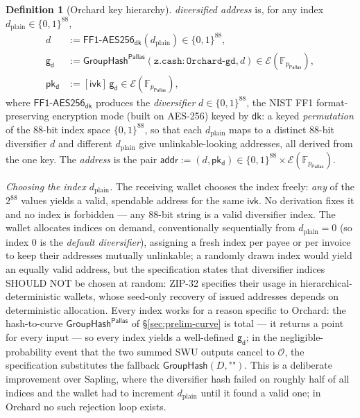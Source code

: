 \documentclass[11pt,a4paper]{article}
\theoremstyle{definition}
\newtheorem{definition}[theorem]{Definition}
\newcommand{\F}{\mathbb{F}}
\newcommand{\Pallas}{\ensuremath{\mathsf{Pallas}}}
\newcommand{\Ep}{\ensuremath{\mathcal{E}}}
\newcommand{\GroupHash}{\ensuremath{\mathsf{GroupHash}}}
\newcommand{\ivk}{\ensuremath{\mathsf{ivk}}}
\newcommand{\dk}{\ensuremath{\mathsf{dk}}}
\newcommand{\pkd}{\ensuremath{\mathsf{pk_d}}}
\newcommand{\gd}{\ensuremath{\mathsf{g_d}}}
\begin{document}
\begin{definition}[Orchard key hierarchy]
\emph{diversified address} is, for any index
$d_{\mathrm{plain}} \in \{0,1\}^{88}$,
\[
\begin{aligned}
d &:= \mathsf{FF1\text{-}AES256}_{\dk}(d_{\mathrm{plain}}) \in \{0,1\}^{88}, \\
\gd &:= \GroupHash^{\Pallas}(\mathtt{z.cash:Orchard\text{-}gd}, d) \in \Ep(\F_{p_{\Pallas}}), \\
\pkd &:= [\ivk]\,\gd \in \Ep(\F_{p_{\Pallas}}),
\end{aligned}
\]
where $\mathsf{FF1\text{-}AES256}_{\dk}$ produces the \emph{diversifier}
$d \in \{0,1\}^{88}$, the NIST FF1 format-preserving
encryption mode (built on AES-256) keyed by $\dk$: a keyed
\emph{permutation} of the $88$-bit index space $\{0,1\}^{88}$, so that each
$d_{\mathrm{plain}}$ maps to a distinct $88$-bit diversifier $d$ and
different $d_{\mathrm{plain}}$ give unlinkable-looking addresses, all
derived from the one key. The \emph{address} is the pair
$\mathsf{addr} := (d, \pkd) \in \{0,1\}^{88} \times \Ep(\F_{p_{\Pallas}})$.

\emph{Choosing the index $d_{\mathrm{plain}}$.} The receiving wallet chooses
the index freely: \emph{any} of the $2^{88}$ values yields a valid,
spendable address for the same $\ivk$. No derivation fixes it and no index
is forbidden --- any $88$-bit string is a valid diversifier index. The wallet
allocates indices on demand,
conventionally sequentially from $d_{\mathrm{plain}} = 0$ (so index $0$ is the
\emph{default diversifier}), assigning a fresh index per payee or per
invoice to keep their addresses mutually unlinkable; a randomly drawn index
would yield an equally valid address, but the specification states that
diversifier indices SHOULD NOT be chosen at random: ZIP-32 specifies their
usage in hierarchical-deterministic wallets, whose seed-only recovery of
issued addresses depends on deterministic allocation. Every
index works for a reason specific to Orchard: the hash-to-curve
$\GroupHash^{\Pallas}$ of \S\ref{sec:prelim-curve} is total --- it returns a
point for every input --- so every index yields a well-defined $\gd$; in the
negligible-probability event that the two summed SWU outputs cancel to
$\mathcal{O}$, the specification substitutes the fallback
$\GroupHash(D, \texttt{""})$. This is a deliberate improvement over Sapling, where the
diversifier hash failed on roughly half of all indices and the wallet had to
increment $d_{\mathrm{plain}}$ until it found a valid one; in Orchard no such
rejection loop exists.


\end{definition}
\end{document}
